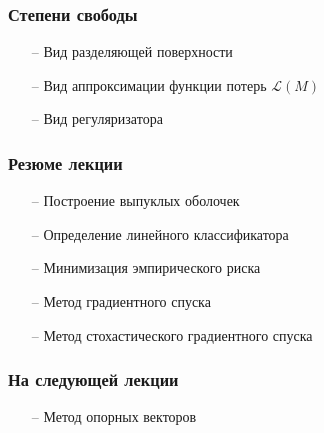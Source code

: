 \documentclass[12pt]{beamer}
\begin{document}
\begin{frame}\frametitle{Степени свободы}
\begin{itemize}
\item[--] Вид разделяющей поверхности
\item[--] Вид аппроксимации функции потерь $\mathcal{L}(M)$
\item[--] Вид регуляризатора
\end{itemize}
\end{frame}

\begin{frame}\frametitle{Резюме лекции}
\begin{itemize}
\item[--] Построение выпуклых оболочек
\item[--] Определение линейного классификатора
\item[--] Минимизация эмпирического риска
\item[--] Метод градиентного спуска
\item[--] Метод стохастического градиентного спуска
\end{itemize}
\end{frame}

\begin{frame}\frametitle{На следующей лекции}
\begin{itemize}
\item[--] Метод опорных векторов
\end{itemize}
\end{frame}
\end{document}
